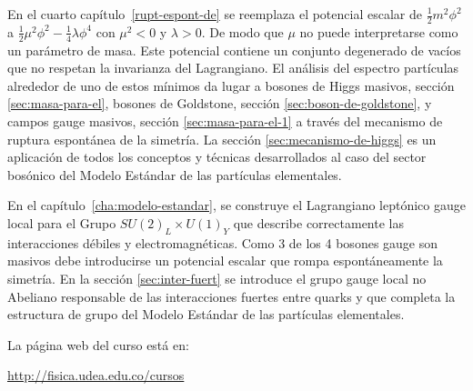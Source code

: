 En el cuarto capítulo~\ref{rupt-espont-de} se %
reemplaza el potencial escalar de $\frac{1}{2}m^2\phi^2$ a $\frac{1}{2}\mu^2\phi^2-\frac{1}{4}\lambda\phi^4$ con $\mu^2\lt 0$ y $\lambda\gt 0$. De modo que $\mu$ no puede interpretarse como un parámetro de masa. Este potencial contiene un conjunto degenerado de vacíos que no respetan la invarianza del Lagrangiano. El análisis del espectro partículas alrededor de uno de estos mínimos da lugar a bosones de Higgs masivos, sección \ref{sec:masa-para-el}, bosones de Goldstone, sección \ref{sec:boson-de-goldstone}, y campos gauge masivos, sección \ref{sec:masa-para-el-1} a través del mecanismo de ruptura espontánea de la simetría. La sección \ref{sec:mecanismo-de-higgs} es un aplicación de todos los conceptos y técnicas desarrollados al caso del sector bosónico del Modelo Estándar de las partículas elementales. 


En el capítulo~\ref{cha:modelo-estandar}, se construye el Lagrangiano leptónico gauge local para el Grupo $SU(2)_L\times U(1)_Y$ que describe correctamente las interacciones débiles y electromagnéticas. Como 3 de los 4 bosones gauge son masivos debe introducirse un potencial escalar que rompa espontáneamente la simetría. En la sección \ref{sec:inter-fuert} se introduce el grupo gauge local no Abeliano responsable de las interacciones fuertes entre quarks y que completa la estructura de grupo del Modelo Estándar de las partículas elementales. 

La página web del curso está en:

\url{http://fisica.udea.edu.co/cursos}%





